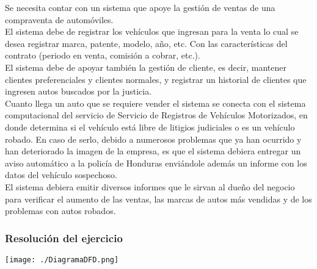 \documentclass[12pt]{article}
\begin{document}
\begin{center}
\begin{minipage}{14cm}
Se necesita contar con un sistema que apoye la gestión de ventas 
de una compraventa de automóviles.\\

El sistema debe de registrar los vehículos que ingresan para la venta
lo cual se desea registrar marca, patente, modelo, año, etc. Con las
características del contrato (periodo en venta, comisión a cobrar, etc.).\\

El sistema debe de apoyar también la gestión de cliente, es decir,
mantener clientes preferenciales y clientes normales, y registrar un historial de clientes que ingresen autos buscados por la justicia. \\

Cuanto llega un auto que se requiere vender el sistema se conecta con el
sistema computacional del servicio de Servicio de Registros de Vehículos
Motorizados, en donde determina si el vehículo está libre de litigios 
judiciales o es un vehículo robado. En caso de serlo, debido a numerosos
problemas que ya han ocurrido y han deteriorado la imagen de la empresa,
es que el sistema debiera entregar un aviso automático a la policía de 
Honduras enviándole además un informe con los datos del vehículo
sospechoso.\\

El sistema debiera emitir diversos informes que le sirvan al dueño del 
negocio para verificar el aumento de las ventas, las marcas de autos más
vendidas y de los problemas con autos robados.

\end{minipage}
\end{center}

\vspace{1cm}


\subsubsection{Resolución del ejercicio}

\vspace{2cm}
  \begin{center}
    {\texttt{[image: ./DiagramaDFD.png]}\par}
  
  \end{center}
\newpage
\end{document}
